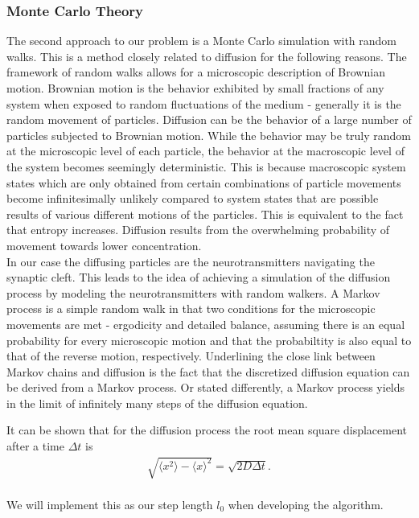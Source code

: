 \documentclass[12pt]{article}
\begin{document}
\begin{flushleft}
\subsubsection{Monte Carlo Theory}
The second approach to our problem is a Monte Carlo simulation with random walks. This is a method closely related to diffusion
for the following reasons.
The framework of random
walks allows for a microscopic description of Brownian motion.
Brownian motion is the behavior exhibited by small fractions of any system when exposed to random fluctuations of the
medium - generally it is the random movement of particles. Diffusion can be the behavior of a large number of particles
subjected to Brownian motion.
While the behavior may be truly random at the microscopic level of each particle, the behavior at the macroscopic level of the system
becomes seemingly deterministic. This is because macroscopic system states which are only obtained from certain combinations of particle movements
become infinitesimally unlikely compared to system states that are possible results of various different motions of the particles.
This is equivalent to the fact that entropy increases. Diffusion results from the overwhelming probability of
movement towards lower concentration.\\
\vspace{5mm}
In our case the diffusing particles are the neurotransmitters navigating the synaptic cleft.
This leads to the idea of achieving a simulation of the diffusion process by
modeling the neurotransmitters with random walkers.
A Markov process is a simple random walk in that two conditions for the microscopic movements are met
- ergodicity and detailed balance, assuming there is an equal probability for every microscopic motion and that the probabiltity
is also equal to that of the reverse motion, respectively.
\vspace{5mm}
Underlining the close link between Markov chains and diffusion is the fact that the discretized diffusion equation can be derived
from a Markov process. Or stated differently, a Markov process yields in the limit of infinitely many steps of the
diffusion equation. \cite{kompendium_hjorth}

It can be shown that for the diffusion process the root mean square displacement
after a time $\Delta t$ is\\
\begin{align}
    \sqrt{\langle x^2\rangle - \langle x\rangle^2} = \sqrt{2D\Delta t}.
\end{align}\\
\vspace{5mm}
We will implement this as our step length $l_0$ when developing the algorithm.


\end{flushleft}
\end{document}
